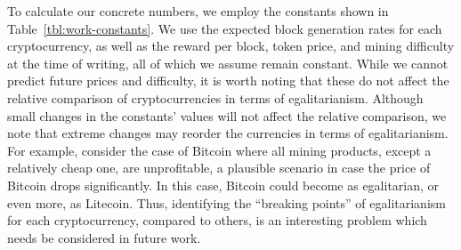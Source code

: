To calculate our concrete numbers, we employ the constants shown in
Table~\ref{tbl:work-constants}. We use the expected block generation rates for
each cryptocurrency, as well as the reward per block, token price, and mining
difficulty at the time of writing, all of which we assume remain constant.
While we cannot predict future prices and difficulty, it is worth noting that
these do not affect the relative comparison of cryptocurrencies in terms of
egalitarianism.  Although small
changes in the constants' values will not affect the relative comparison, we
note that extreme changes may reorder the currencies in terms of
egalitarianism. For example, consider the case of Bitcoin where all mining
products, except a relatively cheap one, are unprofitable, a plausible scenario
in case \eg the price of Bitcoin drops significantly. In this case, Bitcoin
could become as egalitarian, or even more, as \eg Litecoin. Thus, identifying
the ``breaking points'' of egalitarianism for each cryptocurrency, compared to
others, is an interesting problem which needs be considered in future work.

\begin{table}
  \centering
  \caption{The parameters to our proof-of-work mining simulations. Some depend on the cryptocurrency $c$.}
  \label{tbl:work-constants}
\end{table}

